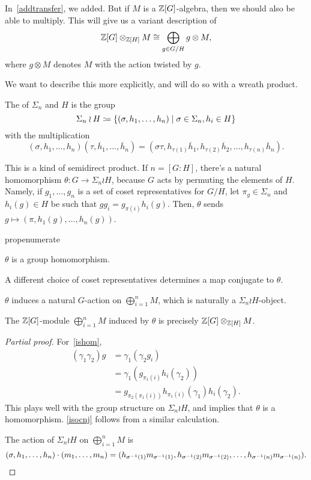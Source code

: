 In~\eqref{addtransfer}, we added. But if $M$ is a $\mathbb Z[G]$-algebra, then we should also be able to multiply. This
will give us a variant description of
\[\mathbb Z[G]\otimes_{\mathbb Z[H]} M\cong \bigoplus_{g\in G/H} g\otimes M,\]
where $g\otimes M$ denotes $M$ with the action twisted by $g$.

We want to describe this more explicitly, and will do so with a wreath product.
\begin{defn}
The  of $\Sigma_n$ and $H$ is the group
\[\Sigma_n\wr H\coloneqq \{(\sigma, h_1,\dotsc,h_n)\mid \sigma\in\Sigma_n, h_i\in H\}\]
with the multiplication
\[(\sigma, h_1,\dotsc, h_n)(\tau, \overline h_1,\dotsc,\overline h_n) = (\sigma\tau, h_{\tau(1)}\overline h_1,
h_{\tau(2)}\overline h_2,\dotsc, h_{\tau(n)}\overline h_n).\]
\end{defn}
This is a kind of semidirect product. If $n = [G:H]$, there's a natural homomorphism $\theta\colon G\to\Sigma_n\wr
H$, because $G$ acts by permuting the elements of $H$. Namely, if $g_1,\dotsc,g_n$ is a set of coset
representatives for $G/H$, let $\pi_g\in\Sigma_n$ and $h_i(g)\in H$ be such that $gg_i = g_{\pi(i)} h_i(g)$. Then,
$\theta$ sends $g\mapsto (\pi, h_1(g),\dotsc,h_n(g))$.
\begin{comp}{prop}{enumerate}
	\item\label{ishom} $\theta$ is a group homomorphism.
	\item\label{isocnj} A different choice of coset representatives determines a map conjugate to $\theta$.
	\item\label{action} $\theta$ induces a natural $G$-action on $\bigoplus_{i=1}^n M$, which is naturally a
	$\Sigma_n\wr H$-object.
	\item The $\mathbb Z[G]$-module $\bigoplus_{i=1}^n M$ induced by $\theta$ is precisely $\mathbb Z[G]\otimes_{\mathbb Z[H]} M$.
\end{comp}
\begin{proof}[Partial proof]
For~\eqref{ishom},
\begin{align*}
	(\gamma_1\gamma_2)g &= \gamma_1(\gamma_2 g_i)\\
	&= \gamma_1(g_{\pi_1(i)} h_i(\gamma_2))\\
	&= g_{\pi_2(\pi_1(i))} h_{\pi_1(i)}(\gamma_1)h_i(\gamma_2).
\end{align*}
This plays well with the group structure on $\Sigma_n\wr H$, and implies that $\theta$ is a homomorphism.
\eqref{isocnj} follows from a similar calculation.

The action of $\Sigma_n\wr H$ on $\bigoplus_{i=1}^n M$ is
\[(\sigma,h_1,\dotsc,h_n)\cdot (m_1,\dotsc,m_n) = (h_{\sigma^{-1}(1)}m_{\sigma^{-1}(1)},
h_{\sigma^{-1}(2)}m_{\sigma^{-1}(2)},\dotsc, h_{\sigma^{-1}(n)} m_{\sigma^{-1}(n)}). \qedhere\]
\end{proof}
